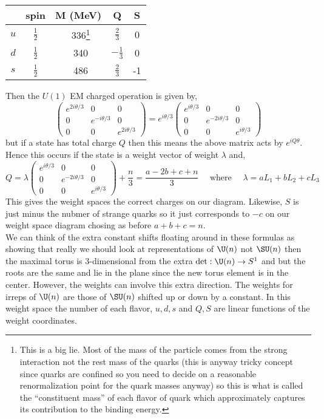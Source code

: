 \documentclass[12pt]{article}
\begin{document}
\begin{center}
\begin{tabular}{||c | c c c c ||} 
 \hline
 & spin & M (MeV) & Q & S \\ [0.5ex] 
 \hline\hline
$u$ & $\tfrac{1}{2}$ & ~336\footnote{This is a big lie. Most of the mass of the particle comes from the strong interaction not the rest mass of the quarks (this is anyway tricky concept since quarks are confined so you need to decide on a reasonable renormalization point for the quark masses anyway) so this is what is called the ``constituent mass'' of each flavor of quark which approximately captures its contribution to the binding energy.} & $\tfrac{2}{3}$ & 0 \\ 
 \hline
$d$ & $\tfrac{1}{2}$ & ~340 & $-\tfrac{1}{3}$ & 0 \\ 
 \hline
$s$ & $\tfrac{1}{2}$ & ~486 & $\tfrac{2}{3}$ &  -1 \\ 
 \hline
\end{tabular}
\end{center}
Then the $U(1)$ EM charged operation is given by,
\[ \begin{pmatrix}
e^{2i \theta/3} & 0 & 0
\\
0 & e^{-i\theta/3} & 0
\\
0 & 0 & e^{2 i \theta/3}
\end{pmatrix} = e^{i \theta/3} \begin{pmatrix}
e^{i \theta/3} & 0 & 0
\\
0 & e^{-2i\theta/3} & 0
\\
0 & 0 & e^{i \theta/3}
\end{pmatrix} \]
but if a state has total charge $Q$ then this means the above matrix acts by $e^{i Q \theta}$. Hence this occurs if the state is a weight vector of weight $\lambda$ and,
\[ Q = \lambda   \begin{pmatrix}
e^{i \theta/3} & 0 & 0
\\
0 & e^{-2i\theta/3} & 0
\\
0 & 0 & e^{i \theta/3}
\end{pmatrix} + \frac{n}{3} = \frac{a - 2 b + c + n}{3} \quad \text{ where } \quad \lambda = a L_1 + b L_2 + c L_3  \]
This gives the weight spaces the correct charges on our diagram. Likewise, $S$ is just minus the nubmer of strange quarks so it just corresponds to $-c$ on our weight space diagram chosing as before $a + b + c = n$.
\bigskip\\
We can think of the extra constant shifts floating around in these formulas as showing that really we should look at representations of $\U(n)$ not $\SU(n)$ then the maximal torus is $3$-dimensional from the extra $\det : \U(n) \to S^1$ and but the roots are the same and lie in the plane since the new torus element is in the center. However, the weights can involve this extra direction. The weights for irreps of $\U(n)$ are those of $\SU(n)$ shifted up or down by a constant. In this weight space the number of each flavor, $u,d,s$ and $Q, S$ are linear functions of the weight coordinates.
\end{document}
